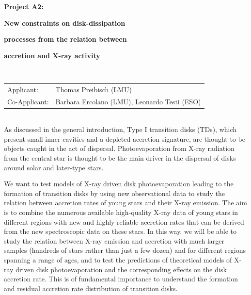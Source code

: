 \documentclass[10pt,fleqn,twoside,a4paper]{article}
\begin{document}


\setcounter{page}{53}

\centerline{\huge\bf\Tcol
%
%
%
%
%
 Project A2:}
\vspace{1em}

\centerline{\LARGE\bf\Tcol New constraints on disk-dissipation}\vspace{0.3em}
\centerline{\LARGE\bf\Tcol processes from the relation between}\vspace{0.3em}
\centerline{\LARGE\bf\Tcol  accretion and  X-ray activity}

%
%
%
%
%
\vskip1.0cm


\\
\begin{tabular}{ll}
{\textsf{Applicant:}}                   & Thomas Preibisch (LMU) \\
{\textsf{Co-Applicant:}}                & Barbara Ercolano (LMU), Leonardo Testi (ESO)\\
\end{tabular}


\vspace{1em}

\vspace{1em}
\\
As discussed in the general introduction, Type I transition disks
(TDs), which present small inner cavities and a depleted accretion
signature, are thought to be objects caught in the act of
dispersal. Photoevaporation from X-ray radiation from the central
star is thought to be the main driver in the dispersal of disks around
solar and later-type stars. 

We want to test models of X-ray driven disk photoevaporation leading
to the formation of transition disks by using
new observational data to study the relation between accretion rates of young stars and
their X-ray emission.
The aim is to combine the numerous available high-quality
X-ray data of young stars  in different regions with new and highly reliable 
accretion rates that can be derived from the new spectroscopic data on these stars.
In this way, we will be able to study the relation between X-ray emission
and accretion with much larger samples (hundreds of stars rather
than just a few dozen) and for different regions spanning a range
of ages, and to test the predictions of theoretical models of
X-ray driven disk photoevaporation and the corresponding effects on
the disk accretion rate. This is of fundamental importance to
understand the formation and residual accretion rate distribution of
transition disks. 
\end{document}

